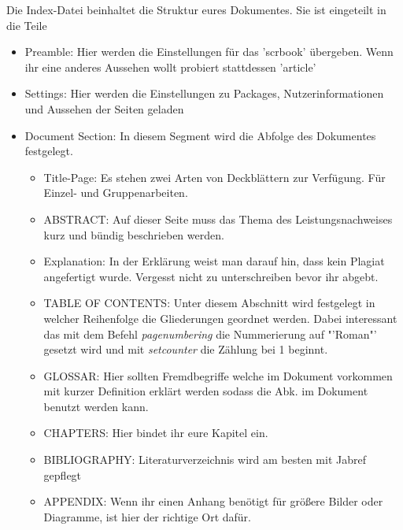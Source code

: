 Die Index-Datei beinhaltet die Struktur eures Dokumentes. Sie ist eingeteilt in die Teile
\begin{itemize}
	\item Preamble: Hier werden die Einstellungen für das 'scrbook' übergeben. Wenn ihr eine anderes Aussehen wollt probiert stattdessen 'article'
	\item Settings: Hier werden die Einstellungen zu Packages, Nutzerinformationen und Aussehen der Seiten geladen
	\item Document Section: In diesem Segment wird die Abfolge des Dokumentes festgelegt. 
	\begin{itemize}
		\item Title-Page: Es stehen zwei Arten von Deckblättern zur Verfügung. Für Einzel- und Gruppenarbeiten.
		\item ABSTRACT: Auf dieser Seite muss das Thema des Leistungsnachweises kurz und bündig beschrieben werden.
		\item Explanation: In der Erklärung weist man darauf hin, dass kein Plagiat angefertigt wurde. Vergesst nicht zu unterschreiben bevor ihr abgebt.
		\item TABLE OF CONTENTS: Unter diesem Abschnitt wird festgelegt in welcher Reihenfolge die Gliederungen geordnet werden. Dabei interessant das mit dem Befehl \emph{pagenumbering} die Nummerierung auf "'Roman"' gesetzt wird und mit \emph{setcounter} die Zählung bei 1 beginnt.
		\item GLOSSAR: Hier sollten Fremdbegriffe welche im Dokument vorkommen mit kurzer Definition erklärt werden sodass die Abk. im Dokument benutzt werden kann.
		\item CHAPTERS: Hier bindet ihr eure Kapitel ein.
		\item BIBLIOGRAPHY: Literaturverzeichnis wird am besten mit Jabref gepflegt
		\item APPENDIX: Wenn ihr einen Anhang benötigt für größere Bilder oder Diagramme, ist hier der richtige Ort dafür.
	\end{itemize}
\end{itemize}